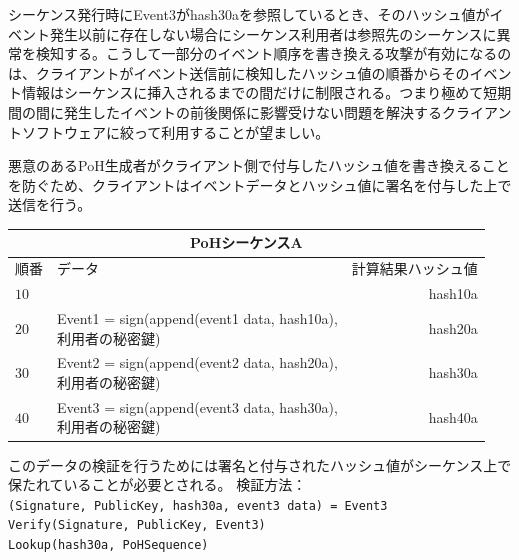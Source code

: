 \documentclass[12pt]{ltjsarticle}
\begin{document}
シーケンス発行時にEvent3がhash30aを参照しているとき、そのハッシュ値がイベント発生以前に存在しない場合にシーケンス利用者は参照先のシーケンスに異常を検知する。こうして一部分のイベント順序を書き換える攻撃が有効になるのは、クライアントがイベント送信前に検知したハッシュ値の順番からそのイベント情報はシーケンスに挿入されるまでの間だけに制限される。つまり極めて短期間の間に発生したイベントの前後関係に影響受けない問題を解決するクライアントソフトウェアに絞って利用することが望ましい。

悪意のあるPoH生成者がクライアント側で付与したハッシュ値を書き換えることを防ぐため、クライアントはイベントデータとハッシュ値に署名を付与した上で送信を行う。\\
\begin{center}
  \begin{tabular}{  l  l  r }
    \multicolumn{3}{c}{PoHシーケンスA} \\
    \hline
    順番  & データ & 計算結果ハッシュ値 \\ \hline
    $10$ & & hash10a  \\ 
    $20$ & \makecell{Event1 = sign(append(event1 data, hash10a), \\利用者の秘密鍵)} & hash20a\\ 
    $30$ & \makecell{Event2 = sign(append(event2 data, hash20a), \\利用者の秘密鍵)} & hash30a \\ 
    $40$ & \makecell{Event3 = sign(append(event3 data, hash30a), \\利用者の秘密鍵)} & hash40a \\

    \end{tabular}
\end{center}

このデータの検証を行うためには署名と付与されたハッシュ値がシーケンス上で保たれていることが必要とされる。\newpage
\noindent 検証方法：\\

\noindent\texttt{(Signature, PublicKey, hash30a, event3 data) = Event3} \\
\texttt{Verify(Signature, PublicKey, Event3)}\\
\texttt{Lookup(hash30a, PoHSequence)}\\
\end{document}
